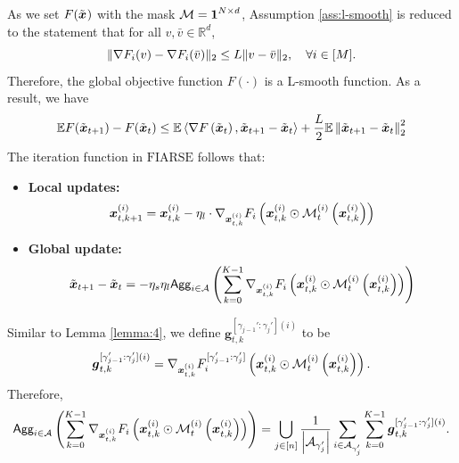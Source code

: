\documentclass{article}
\theoremstyle{plain}
\theoremstyle{definition}
\theoremstyle{remark}
\newcommand{\algo}{\ensuremath{\text{FIARSE}}\xspace}
\newcommand{\E}{\mathbb{E}}
\newcommand{\bracket}[1]{\left(#1\right)}
\newcommand{\norm}[1]{\left\|#1\right\|_2^2}
\newcommand{\innerproduct}[2]{\left\langle#1, #2\right\rangle}
\begin{document}
As we set $F(\x{})$ with the mask $\mask = \boldsymbol{1}^{N \times d}$, Assumption \ref{ass:l-smooth} is reduced to the statement that for all $v, \bar{v} \in \mathbb{R}^d$, 
\begin{equation*}
    \|\nabla F_i(v) - \nabla F_i(\Bar{v})\|_2 \le L\|v-\Bar{v}\|_2, \quad \forall i \in [M].
\end{equation*}
Therefore, the global objective function $F(\cdot)$ is a L-smooth function. As a result, we have 
\begin{align}
    \E F(\x{t+1}) - F(\x{t}) \leq \E \innerproduct{\grad{t}}{\x{t+1} - \x{t}} + \frac{L}{2} \E\norm{\x{t+1} - \x{t}} \label{eq:46}
\end{align}
The iteration function in \algo follows that:
\begin{itemize}
    \item \textbf{Local updates:} 
    \begin{align}
        \x{i}{t}{k+1} = \x{i}{t}{k} - \eta_l \cdot \newmaskgrad{i}{t}{k}
    \end{align}
    \item \textbf{Global update:}
    \begin{align}
        \x{t+1} - \x{t} = - \eta_s \eta_l \agg{i \in \participant} \bracket{\sum_{k=0}^{K-1} \newmaskgrad{i}{t}{k}}
    \end{align}
\end{itemize}
Similar to Lemma \ref{lemma:4}, we define $\boldsymbol{g}_{t,k}^{[\gamma_{j-1}':\gamma_{j}'](i)}$ to be
\begin{align}
\boldsymbol{g}_{t,k}^{[\gamma_{j-1}':\gamma_{j}'](i)} = \newmaskgrad{i}{t}{k}{j}.
\end{align}
Therefore,
\begin{align}
\agg{i \in \participant} \bracket{\sum_{k=0}^{K-1} \newmaskgrad{i}{t}{k}} = \bigcup_{j \in [n]} \frac{1}{\left|\a{j}\right|} \sum_{i \in \a{j}} \sum_{k=0}^{K-1} \boldsymbol{g}_{t,k}^{[\gamma_{j-1}':\gamma_{j}'](i)}.
\end{align}
\end{document}
